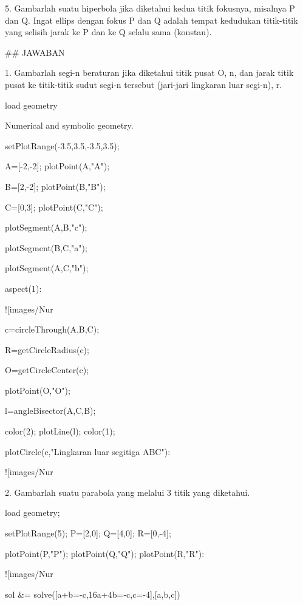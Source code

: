 \documentclass{article}
\begin{document}
5. Gambarlah suatu hiperbola jika diketahui kedua titik fokusnya,
misalnya P dan Q. Ingat ellips dengan fokus P dan Q adalah tempat
kedudukan titik-titik yang selisih jarak ke P dan ke Q selalu sama
(konstan).


## JAWABAN

1. Gambarlah segi-n beraturan jika diketahui titik pusat O, n, dan
jarak titik pusat ke titik-titik sudut segi-n tersebut (jari-jari
lingkaran luar segi-n), r.


\>load geometry


    Numerical and symbolic geometry.

\>setPlotRange(-3.5,3.5,-3.5,3.5);

\>A=[-2,-2]; plotPoint(A,"A");

\>B=[2,-2]; plotPoint(B,"B");

\>C=[0,3]; plotPoint(C,"C");

\>plotSegment(A,B,"c");

\>plotSegment(B,C,"a");

\>plotSegment(A,C,"b");

\>aspect(1):


![images/Nur%

\>c=circleThrough(A,B,C);

\>R=getCircleRadius(c);

\>O=getCircleCenter(c);

\>plotPoint(O,"O");

\>l=angleBisector(A,C,B);

\>color(2); plotLine(l); color(1);

\>plotCircle(c,"Lingkaran luar segitiga ABC"):


![images/Nur%

2. Gambarlah suatu parabola yang melalui 3 titik yang diketahui.


\>load geometry;

\>setPlotRange(5); P=[2,0]; Q=[4,0]; R=[0,-4];

\>plotPoint(P,"P"); plotPoint(Q,"Q"); plotPoint(R,"R"):


![images/Nur%

\>sol &= solve([a+b=-c,16\*a+4\*b=-c,c=-4],[a,b,c])
\end{document}
